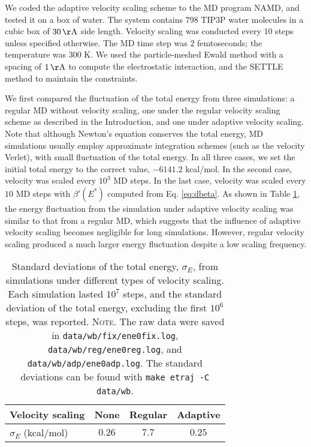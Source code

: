 \documentclass[reprint]{revtex4-1}
\newcommand{\note}[1]{{\color{DarkGreen}\footnotesize \textsc{Note.} #1}}
\begin{document}
We coded the adaptive velocity scaling scheme to
the MD program NAMD\cite{NAMD},
and tested it on a box of water.
%
The system contains
$798$ TIP3P water molecules\cite{jorgensen1983}
in a cubic box of $30 \, \mathrm{\AA}$ side length.
%
Velocity scaling was conducted every $10$ steps
unless specified otherwise.
%
The MD time step was $2$ femtoseconds;
the temperature was $300$ K.
%
We used the particle-meshed Ewald method\cite{essmann1995}
with a spacing of $1 \, \mathrm{\AA}$
to compute the electrostatic interaction,
and the SETTLE method\cite{miyamoto1992}
to maintain the constraints.


We first compared the fluctuation of the total energy
from three simulations:
%
a regular MD without velocity scaling,
one under the regular velocity scaling scheme as described in the Introduction,
and one under adaptive velocity scaling.
%
Note that although Newton's equation conserves the total energy,
MD simulations usually employ approximate integration schemes
(such as the velocity Verlet),
with
small fluctuation of the total energy.
%
In all three cases,
we set the initial total energy to the correct value, $-6141.2$ kcal/mol.
%
In the second case,
velocity was scaled every $10^3$ MD steps.
%
In the last case,
velocity was scaled every $10$ MD steps with
$\beta'(E^*)$ computed from Eq. \eqref{eq:dbeta}.
%
As shown in Table \ref{tab:etraj},
the energy fluctuation from the simulation under adaptive velocity scaling
was similar to that from a regular MD,
which suggests that the influence of adaptive velocity scaling
becomes negligible for long simulations.
%
However, regular velocity scaling
produced a much larger energy fluctuation
despite a low scaling frequency.

\begin{table}[h]
  \setlength{\tabcolsep}{5pt}
  \renewcommand{\arraystretch}{1.5}
  \begin{center}
    \begin{tabular}{ p{2.5cm} | c c c }
      \hline
      Velocity scaling
      &   None    &   Regular   &   Adaptive \\
      \hline
      $\sigma_E$ (kcal/mol)
      &   $0.26$  &   $7.7$     &   $0.25$ \\
      \hline
    \end{tabular}
  \end{center}
  \caption{
    \label{tab:etraj}
    Standard deviations of the total energy, $\sigma_E$,
    from simulations under different types of velocity scaling.
    Each simulation lasted $10^7$ steps,
    and the standard deviation of the total energy,
    excluding the first $10^6$ steps, was reported.
    \note{
      The raw data were saved in
      \texttt{data/wb/fix/ene0fix.log},
      \texttt{data/wb/reg/ene0reg.log},
      and
      \texttt{data/wb/adp/ene0adp.log}.
      The standard deviations can be found with
      \texttt{make etraj -C data/wb}.
    }%
  }
\end{table}
\end{document}
